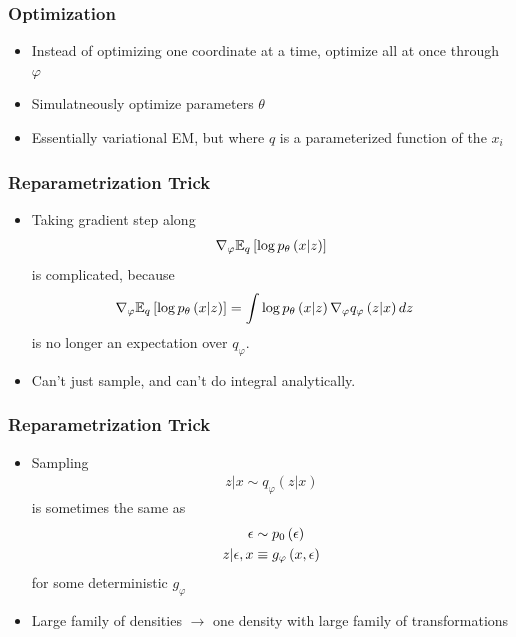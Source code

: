 \documentclass[10pt,mathserif]{beamer}
\begin{document}
\begin{frame}
  \frametitle{Optimization}
\begin{itemize}
\item Instead of optimizing one coordinate at a time, optimize all at once
  through $\varphi$
\item Simulatneously optimize parameters $\theta$
\item Essentially variational EM, but where $q$ is a parameterized function of
  the $x_{i}$
\end{itemize}
\end{frame}

\begin{frame}
  \frametitle{Reparametrization Trick}
  \begin{itemize}
  \item Taking gradient step along
  \begin{align*}
    \nabla_{\varphi} \mathbb{E}_{q}\left[{\log p_{\theta}\left(x \vert z\right)}\right]
  \end{align*}
  is complicated, because
  \begin{align*}
    \nabla_{\varphi} \mathbb{E}_{q}\left[{\log p_{\theta}\left(x \vert z\right)}\right] &= \int \log p_{\theta}\left(x \vert z\right)
    \nabla_{\varphi}q_{\varphi}\left(z \vert x\right)dz
  \end{align*}
  is no longer an expectation over $q_{\varphi}$.
  \item Can't just sample, and can't do integral analytically.
  \end{itemize}
\end{frame}

\begin{frame}
  \frametitle{Reparametrization Trick}
  \begin{itemize}
  \item Sampling
  \begin{align*}
    z \vert x \sim q_{\varphi}\left(z \vert x\right)
  \end{align*}
  is sometimes the same as
  \begin{align*}
    \epsilon &\sim p_{0}\left(\epsilon\right) \\
    z \vert \epsilon, x &\equiv g_{\varphi}\left(x, \epsilon\right)
  \end{align*}
  for some deterministic $g_{\varphi}$
  \item Large family of densities $\rightarrow$ one density with large family of
    transformations
  \end{itemize}
\end{frame}
\end{document}
